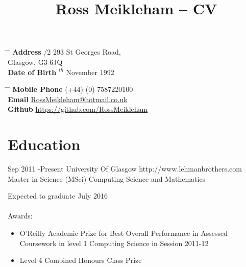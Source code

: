 \documentclass[10pt]{article} %
\begin{document}

\title{Ross Meikleham -- CV} %


\parbox{0.5\textwidth}{ %
\begin{tabbing} %
\hspace{3cm} \= \hspace{4cm} \= \kill %
{\bf Address} /2 293 St Georges Road,\\ %
\> Glasgow, G3 6JQ \\ %
{\bf Date of Birth} $^{th}$ November 1992 \\ %

\end{tabbing}}
\hfill %
\parbox{0.5\textwidth}{ %
\begin{tabbing} %
\hspace{3cm} \= \hspace{4cm} \= \kill %
{\bf Mobile Phone} \> (+44) (0) 7587220100 \\ %
{\bf Email} \> \href{mailto:rossmeikleham@hotmail.co.uk}{RossMeikleham@hotmail.co.uk} \\ %
{\bf Github} \> \href{https://github.com/RossMeikleham}{https://github.com/RossMeikleham}  %
\end{tabbing}}
\section{Education}

\job
{Sep 2011 -}{Present}
{University Of Glasgow}
{http://www.lehmanbrothers.com}
{Master in Science (MSci) Computing Science and Mathematics}
{Expected to graduate July 2016\\\\
Awards:
\begin{itemize}
\item{O’Reilly Academic Prize for Best Overall Performance in Assessed Coursework in level 1 Computing Science in Session 2011-12}
\item{Level 4 Combined Honours Class Prize}
\end{itemize}}
\end{document}
